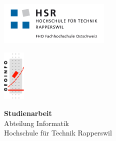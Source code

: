 \begin{titlepage}

\noindent\begin{minipage}[t]{0.49\textwidth}
	\begin{flushleft}
		\vspace{0pt} %
		\includegraphics[width=200px]{./images/logo-hsr}
	\end{flushleft}
\end{minipage}
\hfill
\begin{minipage}[t]{0.49\textwidth}
	\begin{flushright}
		\vspace{0pt} %
		\includegraphics[width=40px]{./images/logo-geoinfo}
	\end{flushright}
\end{minipage}
\vspace{1cm}

\vspace{1cm}

\begin{center}
{\Large \bfseries Studienarbeit}\\[0.5cm]
{\Large
	Abteilung Informatik \\[0.2cm]
	Hochschule für Technik Rapperswil
}
\end{center}
\vspace{1cm}

\vspace{1cm}


\end{titlepage}
